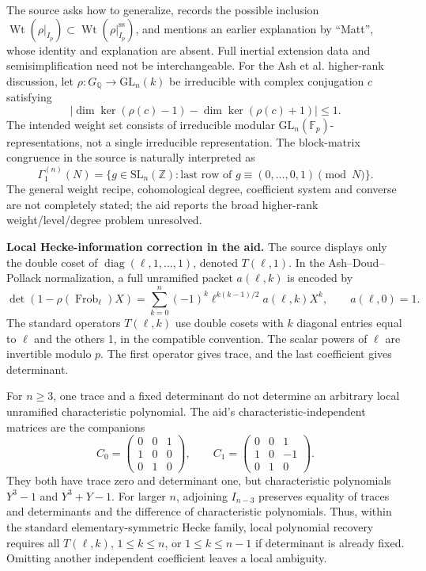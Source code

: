\documentclass[11pt]{article}
\newcommand{\Z}{\mathbb{Z}}
\newcommand{\Q}{\mathbb{Q}}
\newcommand{\F}{\mathbb{F}}
\begin{document}
The source asks how to generalize, records the possible inclusion \(\operatorname{Wt}(\rho|_{I_p})\subset\operatorname{Wt}(\rho|_{I_p}^{\mathrm{ss}})\), and mentions an earlier explanation by ``Matt'', whose identity and explanation are absent. Full inertial extension data and semisimplification need not be interchangeable. For the Ash et al. higher-rank discussion, let \(\rho:G_\Q\to\mathrm{GL}_n(k)\) be irreducible with complex conjugation \(c\) satisfying
\[
 \left|\dim\ker(\rho(c)-1)-\dim\ker(\rho(c)+1)\right|\le1.
\]
The intended weight set consists of irreducible modular \(\mathrm{GL}_n(\F_p)\)-representations, not a single irreducible representation. The block-matrix congruence in the source is naturally interpreted as
\[
 \Gamma_1^{(n)}(N)=\{g\in\mathrm{SL}_n(\Z):
          \text{last row of }g\equiv(0,\ldots,0,1)\pmod N\}.
\]
The general weight recipe, cohomological degree, coefficient system and converse are not completely stated; the aid reports the broad higher-rank weight/level/degree problem unresolved.

\textbf{Local Hecke-information correction in the aid.} The source displays only the double coset of \(\operatorname{diag}(\ell,1,\ldots,1)\), denoted \(T(\ell,1)\). In the Ash--Doud--Pollack normalization, a full unramified packet \(a(\ell,k)\) is encoded by
\[
 \det(1-\rho(\operatorname{Frob}_\ell)X)
 =\sum_{k=0}^n(-1)^k\ell^{k(k-1)/2}a(\ell,k)X^k,
 \qquad a(\ell,0)=1.
\]
The standard operators \(T(\ell,k)\) use double cosets with \(k\) diagonal entries equal to \(\ell\) and the others 1, in the compatible convention. The scalar powers of \(\ell\) are invertible modulo \(p\). The first operator gives trace, and the last coefficient gives determinant.

For \(n\ge3\), one trace and a fixed determinant do not determine an arbitrary local unramified characteristic polynomial. The aid's characteristic-independent matrices are the companions
\[
 C_0=\begin{pmatrix}0&0&1\\1&0&0\\0&1&0\end{pmatrix},\qquad
 C_1=\begin{pmatrix}0&0&1\\1&0&-1\\0&1&0\end{pmatrix}.
\]
They both have trace zero and determinant one, but characteristic polynomials \(Y^3-1\) and \(Y^3+Y-1\). For larger \(n\), adjoining \(I_{n-3}\) preserves equality of traces and determinants and the difference of characteristic polynomials. Thus, within the standard elementary-symmetric Hecke family, local polynomial recovery requires all \(T(\ell,k)\), \(1\le k\le n\), or \(1\le k\le n-1\) if determinant is already fixed. Omitting another independent coefficient leaves a local ambiguity.
\end{document}
